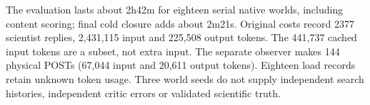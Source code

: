 The evaluation lasts about 2h42m for eighteen serial native worlds, including
content scoring; final cold closure adds about 2m21s. Original costs record
2377 scientist replies, 2,431,115 input and 225,508 output tokens. The 441,737
cached input tokens are a subset, not extra input. The separate observer makes
144 physical POSTs (67,044 input and 20,611 output tokens). Eighteen load
records retain unknown token usage. Three world seeds do not supply independent
search histories, independent critic errors or validated scientific truth.
\FloatBarrier
